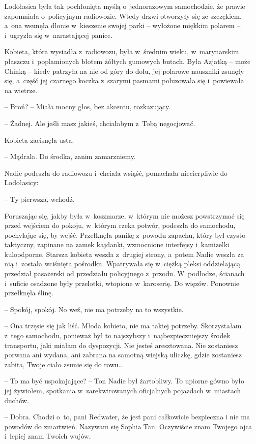 \documentclass[oneside,polish,11pt,sfheadings]{mwbk}
\begin{document}
Lodołasica była tak pochłonięta myślą o~jednorazowym samochodzie, że
prawie zapomniała o~policyjnym radiowozie. Wtedy drzwi otworzyły się ze
szczękiem, a~ona wsunęła dłonie w~kieszenie swojej parki -- wyłożone
miękkim polarem -- i~ugryzła się w~narastającej panice.

Kobieta, która wysiadła z~radiowozu, była w~średnim wieku, w~marynarskim
płaszczu i~poplamionych błotem żółtych gumowych butach. Była Azjatką -- może Chinką -- kiedy patrzyła na nie od góry do dołu, jej polarowe
nauszniki zsunęły się, a~część jej czarnego koczka z~szarymi pasmami
poluzowała się i~powiewała na wietrze.

-- Broń? -- Miała mocny głos, bez akcentu, rozkazujący.

-- Żadnej. Ale jeśli masz jakieś, chciałabym z~Tobą negocjować.

Kobieta zacisnęła usta. 

-- Mądrala. Do środka, zanim zamarzniemy.

Nadie podeszła do radiowozu i~chciała wsiąść, pomachała niecierpliwie do
Lodołasicy: 

-- Ty pierwsza, wchodź.

Poruszając się, jakby była w~koszmarze, w~którym nie możesz powstrzymać
się przed wejściem do pokoju, w~którym czeka potwór, podeszła do
samochodu, pochylając się, by wejść. Przełknęła panikę z~powodu zapachu,
który był czysto taktyczny, zapinane na zamek kajdanki, wzmocnione
interfejsy i~kamizelki kuloodporne. Starsza kobieta weszła z~drugiej
strony, a~potem Nadie weszła za nią i~została wciśnięta pośrodku.
Wpatrywała się w~ciężką pleksi oddzielającą przedział pasażerski od
przedziału policyjnego z~przodu. W~podłodze, ścianach i~suficie osadzone
były przelotki, wtopione w~karoserię. Do więzów. Ponownie przełknęła
ślinę.

-- Spokój, spokój. No weź, nie ma potrzeby na to wszystkie.

-- Ona trzęsie się jak liść. Młoda kobieto, nie ma takiej potrzeby.
Skorzystałam z~tego samochodu, ponieważ był to najszybszy i~najbezpieczniejszy środek transportu, jaki miałam do dyspozycji. Nie
jesteś aresztowana. Nie zostaniesz porwana ani wydana, ani zabrana na
samotną wiejską uliczkę, gdzie zostaniesz zabita, Twoje ciało zsunie się
do rowu\ldots 

-- To ma być uspokajające? -- Ton Nadie był żartobliwy. To upiorne gówno
było jej żywiołem, spotkania w~zarekwirowanych oficjalnych pojazdach w~miastach duchów.

-- Dobra. Chodzi o~to, pani Redwater, że jest pani całkowicie bezpieczna
i nie ma powodów do zmartwień. Nazywam się Sophia Tan. Oczywiście znam
Twojego ojca i~lepiej znam Twoich wujów.
\end{document}
